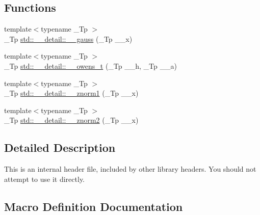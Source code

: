 \subsection*{Functions}
\begin{DoxyCompactItemize}
\item 
{\footnotesize template$<$typename \+\_\+\+Tp $>$ }\\\+\_\+\+Tp \hyperlink{namespacestd_1_1____detail_afdb25beb2328b74d64d9be03de64c442}{std\+::\+\_\+\+\_\+detail\+::\+\_\+\+\_\+gauss} (\+\_\+\+Tp \+\_\+\+\_\+x)
\item 
{\footnotesize template$<$typename \+\_\+\+Tp $>$ }\\\+\_\+\+Tp \hyperlink{namespacestd_1_1____detail_a5b50a9d8beaca5a637c8293ab01bf124}{std\+::\+\_\+\+\_\+detail\+::\+\_\+\+\_\+owens\+\_\+t} (\+\_\+\+Tp \+\_\+\+\_\+h, \+\_\+\+Tp \+\_\+\+\_\+a)
\item 
{\footnotesize template$<$typename \+\_\+\+Tp $>$ }\\\+\_\+\+Tp \hyperlink{namespacestd_1_1____detail_a6827b123253cc6a19947406339738bd7}{std\+::\+\_\+\+\_\+detail\+::\+\_\+\+\_\+znorm1} (\+\_\+\+Tp \+\_\+\+\_\+x)
\item 
{\footnotesize template$<$typename \+\_\+\+Tp $>$ }\\\+\_\+\+Tp \hyperlink{namespacestd_1_1____detail_adf930b70ca943c6810ac7d2ea78d2cc3}{std\+::\+\_\+\+\_\+detail\+::\+\_\+\+\_\+znorm2} (\+\_\+\+Tp \+\_\+\+\_\+x)
\end{DoxyCompactItemize}


\subsection{Detailed Description}
This is an internal header file, included by other library headers. You should not attempt to use it directly. 

\subsection{Macro Definition Documentation}
